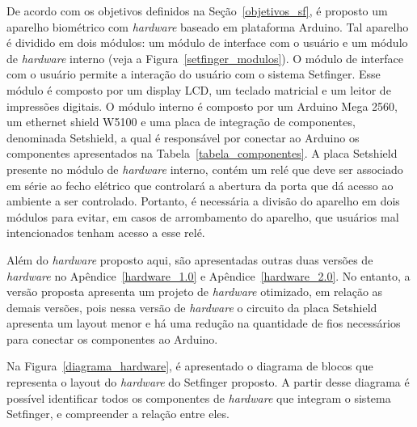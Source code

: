De acordo com os objetivos definidos na Seção~\ref{objetivos_sf}, é proposto um aparelho biométrico com \textit{hardware} baseado em plataforma Arduino. Tal aparelho é dividido em dois módulos: um módulo de interface com o usuário e um módulo de \textit{hardware} interno (veja a Figura~\ref{setfinger_modulos}). O módulo de interface com o usuário permite a interação do usuário com o sistema Setfinger. Esse módulo é composto por um display LCD, um teclado matricial e um leitor de impressões digitais. O módulo interno é composto por um Arduino Mega 2560, um ethernet shield W5100 e uma placa de integração de componentes, denominada Setshield, a qual é responsável por conectar ao Arduino os componentes apresentados na Tabela~\ref{tabela_componentes}. A placa Setshield presente no módulo de \textit{hardware} interno, contém um relé que deve ser associado em série ao fecho elétrico que controlará a abertura da porta que dá acesso ao ambiente a ser controlado. Portanto, é necessária a divisão do aparelho em dois módulos para evitar, em casos de arrombamento do aparelho, que usuários mal intencionados tenham acesso a esse relé.

Além do \textit{hardware} proposto aqui, são apresentadas outras duas versões de \textit{hardware} no Apêndice~\ref{hardware_1.0} e Apêndice~\ref{hardware_2.0}. No entanto, a versão proposta apresenta um projeto de \textit{hardware} otimizado, em relação as demais versões, pois nessa versão de \textit{hardware} o circuito da placa Setshield apresenta um layout menor e há uma redução na quantidade de fios necessários para conectar os componentes ao Arduino.

Na Figura~\ref{diagrama_hardware}, é apresentado o diagrama de blocos que representa o layout do \textit{hardware} do Setfinger proposto. A partir desse diagrama é possível identificar todos os componentes de \textit{hardware} que integram o sistema Setfinger, e compreender a relação entre eles.

